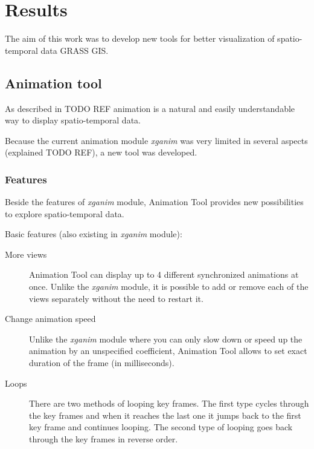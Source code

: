 \documentclass[a4paper,12pt]{article}
\newcommand{\mod}[1]{\textsl{#1}}
\newcommand{\at}{Animation Tool\xspace}
\begin{document}





\section{Results}%

The aim of this work was to develop new tools for better visualization of spatio-temporal data GRASS GIS.

\subsection{Animation tool}
As described in TODO REF animation is a natural and easily understandable way to display spatio-temporal data.

Because the current animation module \mod{xganim} was very limited
in several aspects (explained TODO REF), a new tool was developed.

\subsubsection{Features}
Beside the features of \mod{xganim} module, \at provides new possibilities
to explore spatio-temporal data.

Basic features (also existing in \mod{xganim} module):
    \begin{description}
      \item[More views]
      \at can display up to 4 different synchronized animations at once.
      Unlike the \mod{xganim} module, it is possible to add or remove each of the views separately
      without the need to restart it.

      \item[Change animation speed]
      Unlike the \mod{xganim} module where you can only
      slow down or speed up the animation by an unspecified coefficient, \at allows to set
      exact duration of the frame (in milliseconds).

      \item[Loops]
      There are two methods of looping key frames.
      The first type cycles through the key frames and when it reaches the last one it jumps back
      to the first key frame and continues looping.
      The second type of looping goes back through the key frames in reverse order.

     \end{description}
\end{document}
